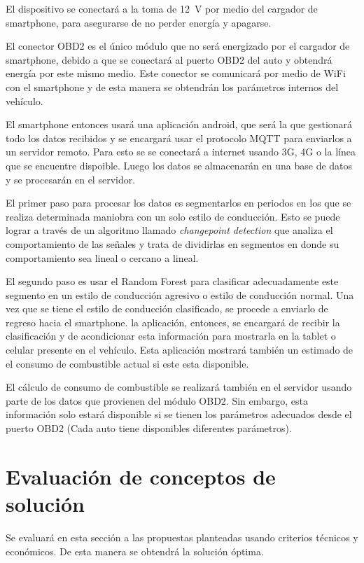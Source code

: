 El dispositivo se conectará a la toma de \SI{12}{V} por medio del cargador de smartphone, para asegurarse de no perder energía y apagarse.

El conector OBD2 es el único módulo que no será energizado por el cargador de smartphone, debido a que se conectará al puerto OBD2 del auto y obtendrá energía por este mismo medio. Este conector se comunicará por medio de WiFi con el smartphone y de esta manera se obtendrán los parámetros internos del vehículo.

El smartphone entonces usará una aplicación android, que será la que gestionará todo los datos recibidos y se encargará usar el protocolo MQTT para enviarlos a un servidor remoto. Para esto se se conectará a internet usando 3G, 4G o la línea que se encuentre dispoible. Luego los datos se almacenarán en una base de datos y se procesarán en el servidor.

El primer paso para procesar los datos es segmentarlos en periodos en los que se realiza determinada maniobra con un solo estilo de conducción. Esto se puede lograr a través de un algoritmo llamado {\it changepoint detection} que analiza el comportamiento de las señales y trata de dividirlas en segmentos en donde su comportamiento sea lineal o cercano a lineal.

El segundo paso es usar el Random Forest para clasificar adecuadamente este segmento en un estilo de conducción agresivo o estilo de conducción normal. Una vez que se tiene el estilo de conducción clasificado, se procede a enviarlo de regreso hacia el smartphone. la aplicación, entonces,  se encargará de recibir la clasificación y de acondicionar esta información para mostrarla en la tablet o celular presente en el vehículo. Esta aplicación mostrará también un estimado de el consumo de combustible actual si este esta disponible.

El cálculo de consumo de combustible se realizará también en el servidor usando parte de los datos que provienen del módulo OBD2. Sin embargo,  esta información solo estará disponible si se tienen los parámetros adecuados desde el puerto OBD2 (Cada auto tiene disponibles diferentes parámetros).

\section{Evaluación de conceptos de solución}
Se evaluará en esta sección a las propuestas planteadas usando criterios técnicos y económicos. De esta manera se obtendrá la solución óptima.

